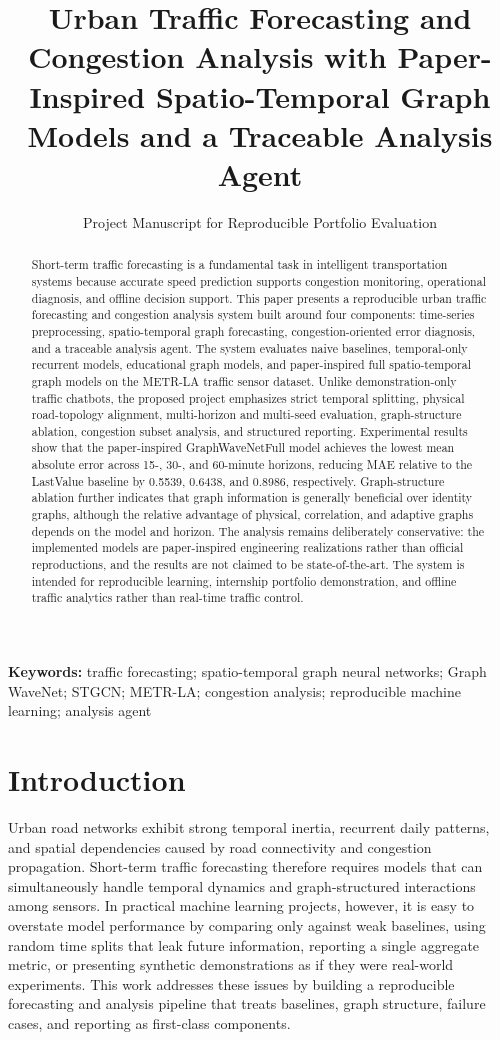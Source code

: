 \documentclass[11pt]{article}
\title{Urban Traffic Forecasting and Congestion Analysis with Paper-Inspired Spatio-Temporal Graph Models and a Traceable Analysis Agent}
\author{Project Manuscript for Reproducible Portfolio Evaluation}
\date{}
\begin{document}
\maketitle

\begin{abstract}
Short-term traffic forecasting is a fundamental task in intelligent transportation systems because accurate speed prediction supports congestion monitoring, operational diagnosis, and offline decision support. This paper presents a reproducible urban traffic forecasting and congestion analysis system built around four components: time-series preprocessing, spatio-temporal graph forecasting, congestion-oriented error diagnosis, and a traceable analysis agent. The system evaluates naive baselines, temporal-only recurrent models, educational graph models, and paper-inspired full spatio-temporal graph models on the METR-LA traffic sensor dataset. Unlike demonstration-only traffic chatbots, the proposed project emphasizes strict temporal splitting, physical road-topology alignment, multi-horizon and multi-seed evaluation, graph-structure ablation, congestion subset analysis, and structured reporting. Experimental results show that the paper-inspired GraphWaveNetFull model achieves the lowest mean absolute error across 15-, 30-, and 60-minute horizons, reducing MAE relative to the LastValue baseline by 0.5539, 0.6438, and 0.8986, respectively. Graph-structure ablation further indicates that graph information is generally beneficial over identity graphs, although the relative advantage of physical, correlation, and adaptive graphs depends on the model and horizon. The analysis remains deliberately conservative: the implemented models are paper-inspired engineering realizations rather than official reproductions, and the results are not claimed to be state-of-the-art. The system is intended for reproducible learning, internship portfolio demonstration, and offline traffic analytics rather than real-time traffic control.
\end{abstract}

\textbf{Keywords:} traffic forecasting; spatio-temporal graph neural networks; Graph WaveNet; STGCN; METR-LA; congestion analysis; reproducible machine learning; analysis agent

\section{Introduction}
Urban road networks exhibit strong temporal inertia, recurrent daily patterns, and spatial dependencies caused by road connectivity and congestion propagation. Short-term traffic forecasting therefore requires models that can simultaneously handle temporal dynamics and graph-structured interactions among sensors. In practical machine learning projects, however, it is easy to overstate model performance by comparing only against weak baselines, using random time splits that leak future information, reporting a single aggregate metric, or presenting synthetic demonstrations as if they were real-world experiments. This work addresses these issues by building a reproducible forecasting and analysis pipeline that treats baselines, graph structure, failure cases, and reporting as first-class components.
\end{document}
